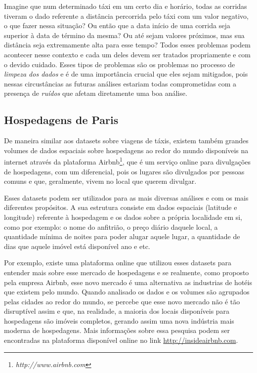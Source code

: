 Imagine que num determinado táxi em um certo dia e horário, todas as corridas tiveram o dado referente a distância percorrida pelo táxi com um valor negativo, o que fazer nessa situação? Ou então que a data início de uma corrida seja superior à data de término da mesma? Ou até sejam valores próximos, mas sua distância seja extremamente alta para esse tempo? Todos esses problemas podem acontecer nesse contexto e cada um deles devem ser tratados propriamente e com o devido cuidado. Esses tipos de problemas são os problemas no processo de \textit{limpeza dos dados} e é de uma importância crucial que eles sejam mitigados, pois nessas circustâncias as futuras análises estariam todas comprometidas com a presença de \textit{ruídos} que afetam diretamente uma boa análise.

\subsection{Hospedagens de Paris}

De maneira similar aos datasets sobre viagens de táxis, existem também grandes volumes de dados espaciais sobre hospedagens ao redor do mundo disponíveis na internet através da plataforma Airbnb\footnote{\it http://www.airbnb.com}, que é um serviço online para divulgações de hospedagens, com um diferencial, pois os lugares são divulgados por pessoas comuns e que, geralmente, vivem no local que querem divulgar.

Esses datasets podem ser utilizados para as mais diversas análises e com os mais diferentes propósitos. A sua estrutura consiste em dados espaciais (latitude e longitude) referente à hospedagem e os dados sobre a própria localidade em si, como por exemplo: o nome do anfitrião, o preço diário daquele local, a quantidade mínima de noites para poder alugar aquele lugar, a quantidade de dias que aquele imóvel está disponível ano e etc.

Por exemplo, existe uma plataforma online que utilizou esses datasets para entender mais sobre esse mercado de hospedagens e se realmente, como proposto pela empresa Airbnb, esse novo mercado é uma alternativa as industrias de hotéis que existem pelo mundo. Quando analisado os dados e os volumes são agrupados pelas cidades ao redor do mundo, se percebe que esse novo mercado não é tão disruptível assim e que, na realidade, a maioria dos locais disponíveis para hospedagens são imóveis completos, gerando assim uma nova indústria mais moderna de hospedagens. Mais informações sobre essa pesquisa podem ser encontradas na plataforma disponível online no link \url{http://insideairbnb.com}.

